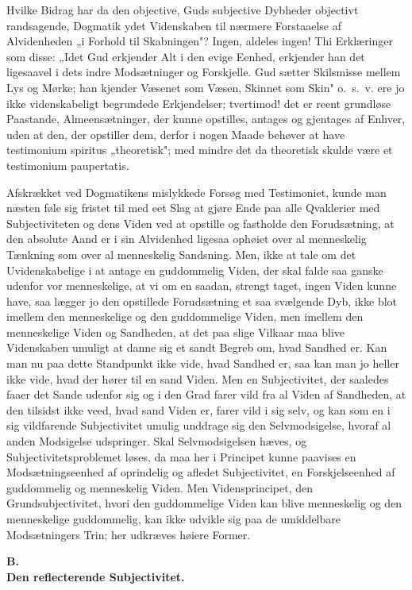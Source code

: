 \documentclass[12pt]{book}
\newcommand{\opage}[1]{\marginnote{\footnotesize\textit{[#1]}}}
\begin{document}
Hvilke Bidrag har da den objective, Guds subjective Dybheder objectivt randsagende,
Dogmatik ydet Videnskaben til nærmere Forstaaelse af Alvidenheden „i Forhold til
Skabningen"? Ingen, aldeles ingen! Thi Erklæringer som disse: „Idet Gud erkjender
Alt i den evige Eenhed, erkjender han det ligesaavel i dets indre Modsætninger og
Forskjelle. Gud sætter Skilsmisse mellem Lys og Mørke; han kjender Væsenet som
Væsen, Skinnet som Skin" o.~s.~v. ere jo ikke videnskabeligt begrundede
Erkjendelser; tvertimod! det er reent grundløse Paastande, Almeensætninger, der
kunne opstilles, antages og gjentages af Enhver, uden at den, der opstiller dem,
derfor i nogen Maade
\opage{53} behøver at have testimonium spiritus „theoretisk"; med mindre det da theoretisk
skulde være et testimonium paupertatis.

Afskrækket ved Dogmatikens mislykkede Forsøg med Testimoniet, kunde man næsten
føle sig fristet til med eet Slag at gjøre Ende paa alle Qvaklerier med
Subjectiviteten og dens Viden ved at opstille og fastholde den Forudsætning, at
den absolute Aand er i sin Alvidenhed ligesaa ophøiet over al menneskelig
Tænkning som over al menneskelig Sandsning. Men, ikke at tale om det
Uvidenskabelige i at antage en guddommelig Viden, der skal falde saa ganske
udenfor vor menneskelige, at vi om en saadan, strengt taget, ingen Viden kunne
have, saa lægger jo den opstillede Forudsætning et saa svælgende Dyb, ikke blot
imellem den menneskelige og den guddommelige Viden, men imellem den menneskelige
Viden og Sandheden, at det paa slige Vilkaar maa blive Videnskaben umuligt at
danne sig et sandt Begreb om, hvad Sandhed er. Kan man nu paa dette Standpunkt
ikke vide, hvad Sandhed er, saa kan man jo heller ikke vide, hvad der hører til en
sand Viden. Men en Subjectivitet, der saaledes faaer det Sande udenfor sig og i
den Grad farer vild fra al Viden af Sandheden, at den tilsidst ikke veed, hvad
sand Viden er, farer vild i sig selv, og kan som en i sig vildfarende
Subjectivitet umulig unddrage sig den Selvmodsigelse, hvoraf al anden Modsigelse
udspringer. Skal Selvmodsigelsen hæves, og Subjectivitetsproblemet løses, da maa
her i Principet kunne paavises en Modsætningseenhed af oprindelig og afledet
Subjectivitet, en Forskjelseenhed af guddommelig og menneskelig Viden. Men
Vidensprincipet, den Grundsubjectivitet, hvori den guddommelige Viden kan blive
menneskelig og den menneskelige guddommelig, kan ikke udvikle sig paa de
umiddelbare Modsætningers Trin; her udkræves høiere Former.

\opage{54} \begin{center}
{\bfseries B.}\\[2pt]
{\large\bfseries Den reflecterende Subjectivitet.}
\end{center}
\end{document}
